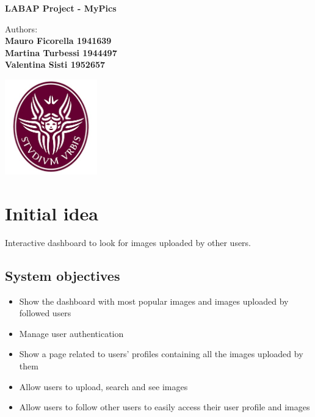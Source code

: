 \documentclass[11pt, a4paper]{article}
\begin{document}
\begin{titlepage}
	\begin{center}
		\vspace*{1cm}
		
		\Huge
		\textbf{LABAP Project - MyPics}
		\vspace{1.5cm}
		
		\Large
		Authors:\\
		\textbf{Mauro Ficorella 1941639}\\
		\textbf{Martina Turbessi 1944497}\\
		\textbf{Valentina Sisti 1952657}\\
		\vspace{0.5cm}
		
		\vfill
		
		\includegraphics[width=0.3\textwidth]{images/Logo.jpg}
		
		\vfill
		
		\vspace{0.8cm}
		
		\Large
	\end{center}
\end{titlepage}

\tableofcontents


\newpage

\section{Initial idea}
Interactive dashboard to look for images uploaded by other users.

\subsection{System objectives}
\begin{itemize}
    \item Show the dashboard with most popular images and images uploaded by followed users
    \item Manage user authentication
    \item Show a page related to users’ profiles containing all the images uploaded by them
    \item Allow users to upload, search and see images
    \item Allow users to follow other users to easily access their user profile and images
\end{itemize}
\end{document}

